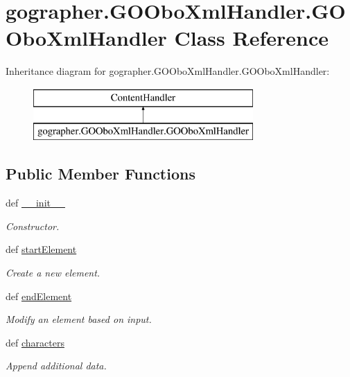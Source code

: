 \hypertarget{classgographer_1_1_g_o_obo_xml_handler_1_1_g_o_obo_xml_handler}{\section{gographer.\-G\-O\-Obo\-Xml\-Handler.\-G\-O\-Obo\-Xml\-Handler Class Reference}
\label{classgographer_1_1_g_o_obo_xml_handler_1_1_g_o_obo_xml_handler}
}
Inheritance diagram for gographer.\-G\-O\-Obo\-Xml\-Handler.\-G\-O\-Obo\-Xml\-Handler\-:\begin{figure}[H]
\begin{center}
\leavevmode
\includegraphics[height=2.000000cm]{classgographer_1_1_g_o_obo_xml_handler_1_1_g_o_obo_xml_handler}
\end{center}
\end{figure}
\subsection*{Public Member Functions}
\begin{DoxyCompactItemize}
\item 
def \hyperlink{classgographer_1_1_g_o_obo_xml_handler_1_1_g_o_obo_xml_handler_a607dac4f99309079ba554cbc63e81df0}{\-\_\-\-\_\-init\-\_\-\-\_\-}
\begin{DoxyCompactList}\small\item\em Constructor. \end{DoxyCompactList}\item 
def \hyperlink{classgographer_1_1_g_o_obo_xml_handler_1_1_g_o_obo_xml_handler_ad2748207a1532b858ab2e7f94861f06d}{start\-Element}
\begin{DoxyCompactList}\small\item\em Create a new element. \end{DoxyCompactList}\item 
def \hyperlink{classgographer_1_1_g_o_obo_xml_handler_1_1_g_o_obo_xml_handler_a91ee43134b69f11fcad5d20b162841a8}{end\-Element}
\begin{DoxyCompactList}\small\item\em Modify an element based on input. \end{DoxyCompactList}\item 
def \hyperlink{classgographer_1_1_g_o_obo_xml_handler_1_1_g_o_obo_xml_handler_a5f2925a757bb5bf9f07696cb8042c2f2}{characters}
\begin{DoxyCompactList}\small\item\em Append additional data. \end{DoxyCompactList}\end{DoxyCompactItemize}
